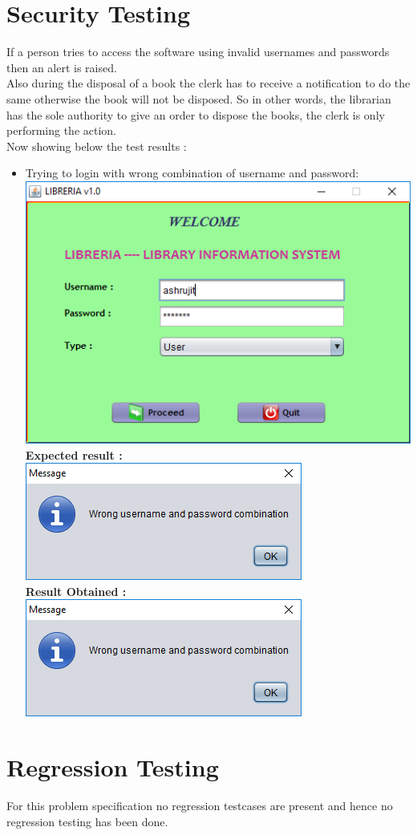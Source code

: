 \documentclass{article}
\begin{document}
\section{Security Testing}
If a person tries to access the software using invalid usernames and passwords then an alert is raised.\\
Also during the disposal of a book the clerk has to receive a notification to do the same otherwise the book will not be disposed. So in other words, the librarian has the sole authority to give an order to dispose the books, the clerk is only performing the action.\\
Now showing below the test results :\\
\begin{itemize}
\item Trying to login with wrong combination of username and password:\\
\includegraphics[scale=0.8]{images/WrongUsername.PNG}
\\\textbf{Expected result :}\\
\includegraphics[scale=0.8]{images/LoginError1.PNG}\\
\textbf{Result Obtained :}\\
\includegraphics[scale=0.8]{images/LoginError1.PNG}\\


\end{itemize}
\section{Regression Testing}
For this problem specification no regression testcases are present and hence no regression testing has been done.
\end{document}
